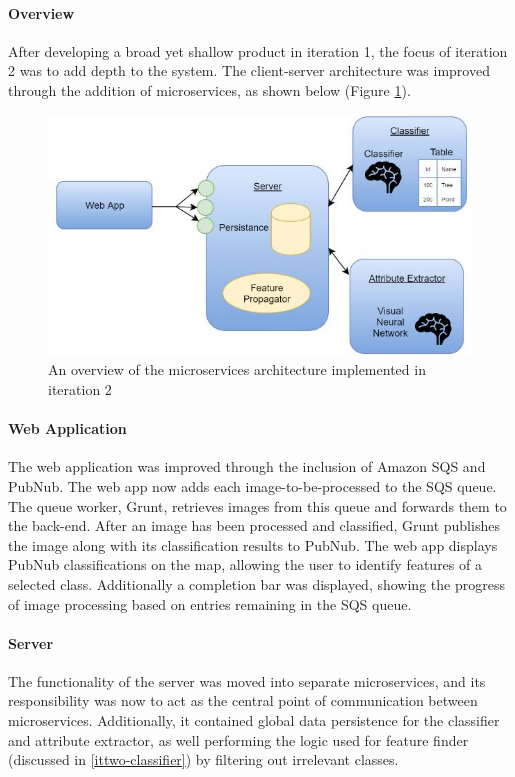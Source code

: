 \paragraph{Overview\\}
After developing a broad yet shallow product in iteration 1, the focus of iteration 2 was to add depth to the system. The client-server architecture was improved through the addition of microservices, as shown below (Figure \ref{fig:iteration2_overview}).
\begin{figure}[H]
    \centering
    \includegraphics[width=\textwidth]{figs/4/iteration2_overview}
    \caption{An overview of the microservices architecture implemented in iteration 2}
    \label{fig:iteration2_overview}
\end{figure}
\paragraph{Web Application\\}
The web application was improved through the inclusion of Amazon SQS and PubNub. The web app now adds each image-to-be-processed to the SQS queue. The queue worker, Grunt, retrieves images from this queue and forwards them to the back-end. After an image has been processed and classified, Grunt publishes the image along with its classification results to PubNub. The web app displays PubNub classifications on the map, allowing the user to identify features of a selected class. Additionally a completion bar was displayed, showing the progress of image processing based on entries remaining in the SQS queue.
\paragraph{Server\\}
The functionality of the server was moved into separate microservices, and its responsibility was now to act as the central point of communication between microservices. Additionally, it contained global data persistence for the classifier and attribute extractor, as well performing the logic used for feature finder (discussed in \ref{ittwo-classifier}) by filtering out irrelevant classes. 
